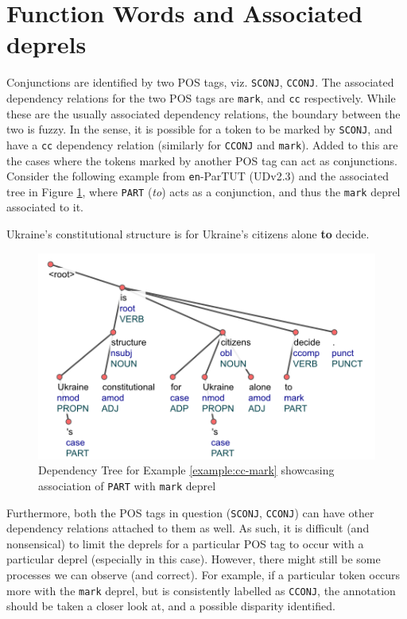 \section{Function Words and Associated deprels}
\label{sssec:conj_deprels_association}

Conjunctions are identified by two POS tags, viz. \verb|SCONJ|, \verb|CCONJ|. The associated dependency relations for the two POS tags are \verb|mark|, and \verb|cc| respectively. While these are the usually associated dependency relations, the boundary between the two is fuzzy. In the sense, it is possible for a token to be marked by \verb|SCONJ|, and have a \verb|cc| dependency relation (similarly for \verb|CCONJ| and \verb|mark|). Added to this are the cases where the tokens marked by another POS tag can act as conjunctions. Consider the following example from \verb|en|-ParTUT (UDv2.3) and the associated tree in Figure \ref{fig:func_multi}, where \verb|PART| (\textit{to}) acts as a conjunction, and thus the \verb|mark| deprel associated to it.

\begin{example}
\label{example:cc-mark}
Ukraine's constitutional structure is for Ukraine's citizens alone \textbf{to} decide.
\end{example}

\begin{figure}[ht]
    \centering
    \includegraphics{img/cc-mark.png}
    \caption[Dependency Tree showcasing association of \texttt{PART} with \texttt{mark} deprel]{Dependency Tree for Example \ref{example:cc-mark} showcasing association of \texttt{PART} with \texttt{mark} deprel}
    \label{fig:func_multi}
\end{figure}

Furthermore, both the POS tags in question (\verb|SCONJ|, \verb|CCONJ|) can have other dependency relations attached to them as well. As such, it is difficult (and nonsensical) to limit the deprels for a particular POS tag to occur with a particular deprel (especially in this case). However, there might still be some processes we can observe (and correct). For example, if a particular token occurs more with the \verb|mark| deprel, but is consistently labelled as \verb|CCONJ|, the annotation should be taken a closer look at, and a possible disparity identified.

